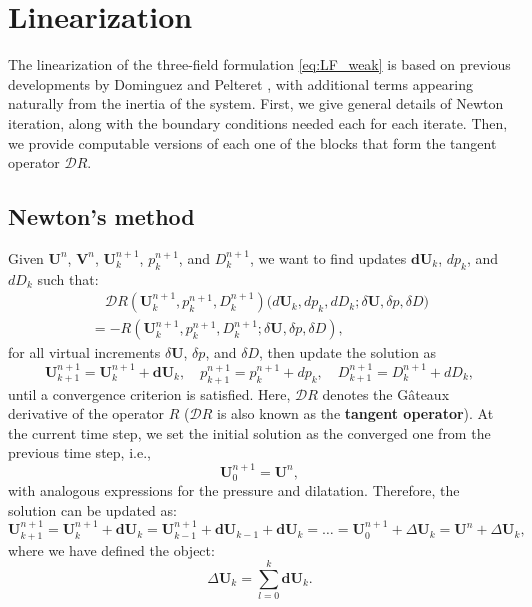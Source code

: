 \documentclass{sfuthesis}
\numberwithin{equation}{section}
\numberwithin{figure}{chapter}
\numberwithin{table}{chapter}
\theoremstyle{definition}
\def\*#1{{\mathbf{#1}}} %
\renewcommand{\c}{\mathbbm{c}}
\begin{document}
\section{Linearization}

The linearization of the three-field formulation \eqref{eq:LF_weak} is based on previous developments by Dominguez \cite{Seba} and Pelteret \cite{PelteretThesis}, with additional terms appearing naturally from the inertia of the system. First, we give general details of Newton iteration, along with the boundary conditions needed each for each iterate. Then, we provide computable versions of each one of the blocks that form the tangent operator $\bm{\mathcal{D}}R$.

\subsection{Newton's method} \label{sec:newton_method}

Given $\*U^n$, $\*V^n$, $\*U^{n+1}_k$, $p^{n+1}_k$, and $D^{n+1}_k$, we want to find updates $\*d \*U_k$, $d p_k$, and $d D_k$ such that:
\begin{multline} \label{eq:newton}
    \quad \bm{\mathcal{D}}R(\*U^{n+1}_k, p^{n+1}_k, D^{n+1}_k) \Big(d \*U_k, d p_k, d D_k ; \delta \*U, \delta p, \delta D \Big) \\
    = - R(\*U^{n+1}_k, p^{n+1}_k, D^{n+1}_k ; \delta \*U, \delta p, \delta D), \quad
\end{multline}
for all virtual increments $\delta \*U$, $\delta p$, and $\delta D$, then update the solution as
\begin{equation} \label{eq:update_theory}
\*U^{n+1}_{k+1} = \*U^{n+1}_k + \*d \*U_k, \quad 
p^{n+1}_{k+1} = p^{n+1}_k + d p_k, \quad 
D^{n+1}_{k+1} = D^{n+1}_k + d D_k,
\end{equation}
until a convergence criterion is satisfied. Here, $\bm{\mathcal{D}} R$ denotes the G\^{a}teaux derivative of the operator $R$ ($\bm{\mathcal{D}} R$ is also known as the \textbf{tangent operator}). At the current time step, we set the initial solution as the converged one from the previous time step, i.e.,
\begin{equation}
\*U_0^{n+1} = \*U^n,
\end{equation}
with analogous expressions for the pressure and dilatation. Therefore, the solution can be updated as:
\begin{equation} \label{eq:update_practice}
\*U^{n+1}_{k+1} = \*U^{n+1}_k + \*d\*U_k = \*U^{n+1}_{k-1} + \*d\*U_{k-1} + \*d \*U_k = \dots = \*U_0^{n+1} + \Delta \*U_k = \*U^n + \Delta \*U_k,
\end{equation}
where we have defined the object:
\begin{equation}
\Delta \*U_k = \sum_{l = 0}^k \*d \*U_k.
\end{equation}
\end{document}
